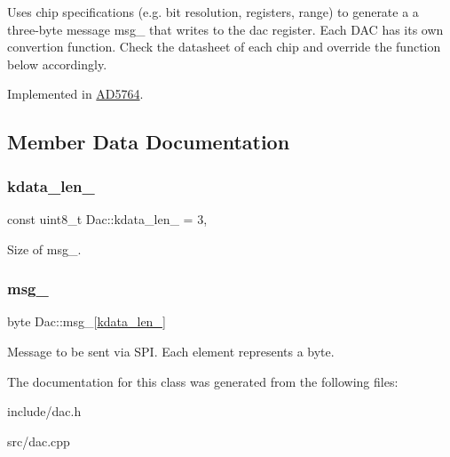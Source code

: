 Uses chip specifications (e.\+g. bit resolution, registers, range) to generate a a three-\/byte message msg\+\_\+ that writes to the dac register. Each D\+AC has its own convertion function. Check the datasheet of each chip and override the function below accordingly. 

Implemented in \mbox{\hyperlink{classAD5764_a85fac1341f18b4a7014da415b421cd03}{A\+D5764}}.



\subsection{Member Data Documentation}
\mbox{\label{classDac_af3de0bf669183e66ebf916f8c685fe6b}} 
\subsubsection{\texorpdfstring{kdata\+\_\+len\+\_\+}{kdata\_len\_}}
{\footnotesize\ttfamily const uint8\+\_\+t Dac\+::kdata\+\_\+len\+\_\+ = 3\hspace{0.3cm}{\ttfamily [static]}, {\ttfamily [protected]}}

Size of msg\+\_\+. \mbox{\label{classDac_a82d9c857af6ba19123b3f5d5187dce1d}} 
\subsubsection{\texorpdfstring{msg\+\_\+}{msg\_}}
{\footnotesize\ttfamily byte Dac\+::msg\+\_\+\mbox{[}\mbox{\hyperlink{classDac_af3de0bf669183e66ebf916f8c685fe6b}{kdata\+\_\+len\+\_\+}}\mbox{]}\hspace{0.3cm}{\ttfamily [protected]}}

Message to be sent via S\+PI. Each element represents a byte. 

The documentation for this class was generated from the following files\+:\begin{DoxyCompactItemize}
\item 
include/dac.\+h\item 
src/dac.\+cpp\end{DoxyCompactItemize}
